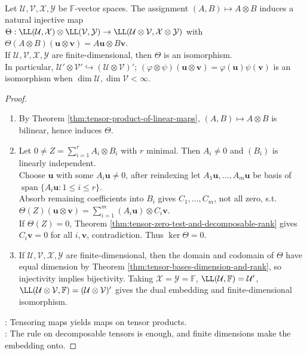 \begin{theorem} \label{thm:tensor-product-of-map-spaces} \\
Let $\mathcal{U},\mathcal{V},\mathcal{X},\mathcal{Y}$ be $\mathbb{F}$-vector spaces. The assignment $(A,B)\mapsto A\otimes B$ induces a natural injective map\\
$\Theta:\LL(\mathcal{U},\mathcal{X})\otimes\LL(\mathcal{V},\mathcal{Y}) \to \LL(\mathcal{U}\otimes\mathcal{V},\mathcal{X}\otimes\mathcal{Y})$ with $\Theta(A\otimes B)(\mathbf{u}\otimes\mathbf{v})=A\mathbf{u}\otimes B\mathbf{v}$.\\
If $\mathcal{U},\mathcal{V},\mathcal{X},\mathcal{Y}$ are finite-dimensional, then $\Theta$ is an isomorphism.\\
In particular, $\mathcal{U}'\otimes\mathcal{V}'\hookrightarrow(\mathcal{U}\otimes\mathcal{V})'$; $(\varphi\otimes\psi)(\mathbf{u}\otimes\mathbf{v})=\varphi(\mathbf{u})\psi(\mathbf{v})$ is an isomorphism when $\dim\mathcal{U},\dim\mathcal{V}<\infty$.
\begin{proof}
\begin{enumerate}[label=(\roman*)]
\setlength{\itemsep}{0pt}
\item By Theorem \ref{thm:tensor-product-of-linear-maps}, $(A,B)\mapsto A\otimes B$ is bilinear, hence induces $\Theta$.
\item Let $0\neq Z=\sum\limits_{i=1}^{r}A_i\otimes B_i$ with $r$ minimal. Then $A_i\neq0$ and $(B_i)$ is linearly independent.\\
Choose $\mathbf{u}$ with some $A_i\mathbf{u}\neq0$, after reindexing let $A_1\mathbf{u},\ldots,A_m\mathbf{u}$ be basis of $\operatorname{span}\{A_i\mathbf{u}:1\le i\le r\}$.\\
Absorb remaining coefficients into $B_i$ gives $C_1,\ldots,C_m$, not all zero, s.t. $\Theta(Z)(\mathbf{u}\otimes\mathbf{v})=\sum\limits_{i=1}^{m}(A_i\mathbf{u})\otimes C_i\mathbf{v}$.\\
If $\Theta(Z)=0$, Theorem \ref{thm:tensor-zero-test-and-decomposable-rank} gives $C_i\mathbf{v}=0$ for all $i,\mathbf{v}$, contradiction. Thus $\ker\Theta=0$.
\item If $\mathcal{U},\mathcal{V},\mathcal{X},\mathcal{Y}$ are finite-dimensional, then the domain and codomain of $\Theta$ have equal dimension by Theorem \ref{thm:tensor-bases-dimension-and-rank}, so injectivity implies bijectivity. Taking $\mathcal{X}=\mathcal{Y}=\mathbb{F}$, $\LL(\mathcal{U},\mathbb{F})=\mathcal{U}'$, $\LL(\mathcal{U}\otimes\mathcal{V},\mathbb{F})=(\mathcal{U}\otimes\mathcal{V})'$ gives the dual embedding and finite-dimensional isomorphism.
\end{enumerate}
: Tensoring maps yields maps on tensor products.\\
: The rule on decomposable tensors is enough, and finite dimensions make the embedding onto.
\end{proof}
\end{theorem}

